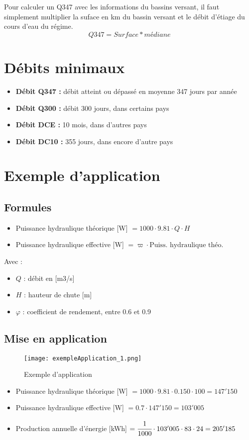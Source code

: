 Pour calculer un Q347 avec les informations du bassins versant, il faut simplement multiplier la suface en km du bassin versant et le débit d'étiage du cours d'eau du régime.
\begin{equation}
    Q347 = Surface * médiane
\end{equation}

\section{Débits minimaux}
\begin{itemize}
    \item \textbf{Débit Q347 :} débit atteint ou dépassé en moyenne 347 jours par année
    \item \textbf{Débit Q300 :} débit 300 jours, dans certains pays
    \item \textbf{Débit DCE :} 10 mois, dans d'autres pays
    \item \textbf{Débit DC10 :} 355 jours, dans encore d'autre pays
\end{itemize}

\section{Exemple d'application}
\subsection{Formules}
\begin{itemize}
    \item Puissance hydraulique théorique [W] $= 1000 \cdot 9.81 \cdot Q \cdot H$
    \item Puissance hydraulique effective [W] $= \varpi \cdot \text{Puiss. hydraulique théo.}$
\end{itemize}
Avec :
\begin{itemize}
    \item $Q$ : débit en [m3/s]
    \item $H$ : hauteur de chute [m]
    \item $\varphi$ : coefficient de rendement, entre 0.6 et 0.9
\end{itemize}

\subsection{Mise en application}
\begin{figure}[H]
    \centering
    \texttt{[image: exempleApplication\_1.png]}
    \caption{Exemple d'application}
\end{figure}

\begin{itemize}
    \item Puissance hydraulique théorique [W] $= 1000 \cdot 9.81 \cdot 0.150 \cdot 100 = 147'150$
    \item Puissance hydraulique effective [W] $= 0.7 \cdot 147'150 = 103'005$
    \item Production annuelle d'énergie [kWh] $= \cfrac{1}{1000}  \cdot 103'005 \cdot 83 \cdot 24 = 205'185$
\end{itemize}